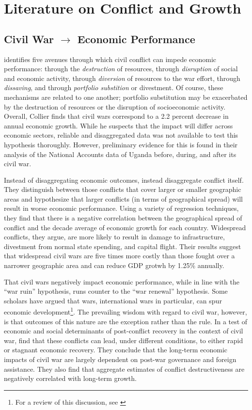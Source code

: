 \section{Literature on Conflict and Growth}
\label{lit}

\subsection{Civil War $\rightarrow$ Economic Performance}

\cite{collier:1999} identifies five avenues through which civil conflict can impede economic performance: through the \textit{destruction} of resources, through \textit{disruption} of social and economic activity, through \textit{diversion} of resources to the war effort, through \textit{dissaving}, and through \textit{portfolio substition} or divestment. Of course, these mechanisms are related to one another; portfolio substitution may be exacerbated by the destruction of resources or the disruption of socioeconomic activity. Overall, Collier finds that civil wars correspond to a 2.2 percent decrease in annual economic growth. While he suspects that the impact will differ across economic sectors, reliable and disaggregated data was not available to test this hypothesis thoroughly. However, preliminary evidence for this is found in their analysis of the National Accounts data of Uganda before, during, and after its civil war.

Instead of disaggregating economic outcomes, \citet{imai:weinstein:2000} instead disaggregate conflict itself. They distinguish between those conflicts that cover larger or smaller geographic areas and hypothesize that larger conflicts (in terms of geographical spread) will result in worse economic performance. Using a variety of regression techniques, they find that there is a negative correlation between the geographical spread of conflict and the decade average of economic growth for each country. Widespread conflicts, they argue, are more likely to result in damage to infrastructure, divestment from normal state spending, and capital flight. Their results suggest that widespread civil wars are five times more costly than those fought over a narrower geographic area and can reduce GDP grotwh by 1.25\% annually.

That civil wars negatively impact economic performance, while in line with the ``war ruin'' hypothesis, runs counter to the ``war renewal'' hypothesis. Some scholars have argued that wars, international wars in particular, can spur economic development\footnote{For a review of this discussion, see \citet{rasler:thompson:1985}}. The prevailing wisdom with regard to civil war, however, is that outcomes of this nature are the exception rather than the rule. In a test of economic and social determinants of post-conflict recovery in the context of civil war, \citet{kang:meernik:2005} find that these conflicts can lead, under different conditions, to either rapid or stagnant economic recovery. They conclude that the long-term economic impacts of civil war are largely dependent on post-war governance and foreign assistance. They also find that aggregate estimates of conflict destructiveness are negatively correlated with long-term growth.

